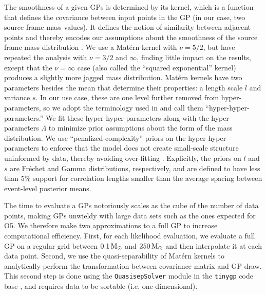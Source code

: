 \documentclass[]{aastex631}
\begin{document}
The smoothness of a given \acp{GP} is determined by its kernel, which is a function that defines the covariance between input points in the \ac{GP} (in our case, two source frame mass values). 
It defines the notion of similarity between adjacent points and thereby encodes our assumptions about the smoothness of the source frame mass distribution \citep{rasmussen_gaussian_2006}.
We use a Mat\'ern kernel \citep{handcock_bayesian_1993, stein_interpolation_1999} with $\nu = 5/2$, but have repeated the analysis with $\nu=3/2$ and $\infty$, finding little impact on the results, except that the $\nu=\infty$ case (also called the ``squared exponential'' kernel) produces a slightly more jagged mass distribution.
Mat\'ern kernels have two parameters besides the mean that determine their properties: a length scale $l$ and variance $s$.
In our use case, these are one level further removed from hyper-parameters, so we adopt the terminology used in \citet{callister_parameter-free_2023} and call them ``hyper-hyper-parameters.''
We fit these hyper-hyper-parameters along with the hyper-parameters $\Lambda$ to minimize prior assumptions about the form of the mass distribution.
We use ``penalized-complexity'' priors on the hyper-hyper-parameters to enforce that the model does not create small-scale structure uninformed by data, thereby avoiding over-fitting \citep{simpson_penalising_2017,simpson_garcpas_2022}. 
Explicitly, the priors on $l$ and $s$ are Fr\'echet and Gamma distributions, respectively, and are defined to have less than 5\% support for correlation lengths smaller than the average spacing between event-level posterior means.

The time to evaluate a \acp{GP} notoriously scales as the cube of the number of data points, making \acp{GP} unwieldy with large data sets such as the ones expected for \ac{O5}.
We therefore make two approximations to a full \ac{GP} to increase computational efficiency.
First, for each likelihood evaluation, we evaluate a full \ac{GP} on a regular grid between $0.1\,\text{M}_{\odot}$ and $250\,\text{M}_{\odot}$ and then interpolate it at each data point.
Second, we use the quasi-separability of Mat\'ern kernels to analytically perform the transformation between covariance matrix and \ac{GP} draw.
This second step is done using the \texttt{QuasisepSolver} module \citep{foreman-mackey_fast_2017} in the \texttt{tinygp} code base \citep{foreman-mackey_tinygp_2021}, and requires data to be sortable (i.e. one-dimensional).
\end{document}
